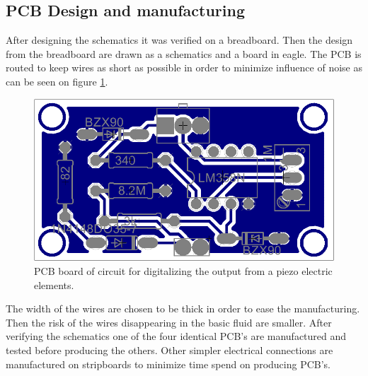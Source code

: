 \subsection{PCB Design and manufacturing}
After designing the schematics it was verified on a breadboard. Then the design from the breadboard are drawn as a schematics and a board in eagle.
The PCB is routed to keep wires as short as possible in order to minimize influence of noise as can be seen on figure \ref{fig:pcb}.
\begin{figure}[htb]
	\centering
	\includegraphics[width=.6\textwidth]{figures/pcb}
	\caption{PCB board of circuit for digitalizing the output from a piezo electric elements.}
	\label{fig:pcb}
\end{figure}
The width of the wires are chosen to be thick in order to ease the manufacturing. Then the risk of the wires disappearing in the basic fluid are smaller.
After verifying the schematics one of the four identical PCB's are manufactured and tested before producing the others.
Other simpler electrical connections are manufactured on stripboards to minimize time spend on producing PCB's.
